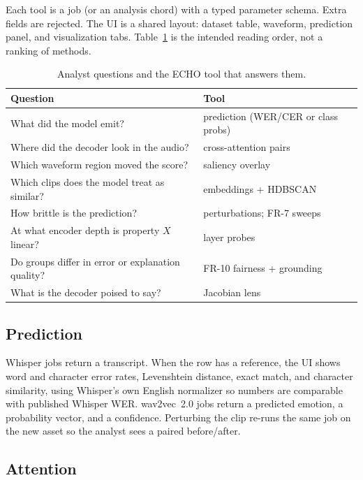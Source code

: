 \documentclass[conference]{IEEEtran}
\begin{document}
Each tool is a job (or an analysis chord) with a typed parameter schema. Extra fields are rejected. The UI is a shared layout: dataset table, waveform, prediction panel, and visualization tabs. Table~\ref{tab:questions} is the intended reading order, not a ranking of methods.

\begin{table}[!t]
\caption{Analyst questions and the ECHO tool that answers them.}
\label{tab:questions}
\centering
\setlength{\tabcolsep}{2.5pt}
\begin{tabular}{@{}p{}p{}@{}}
\toprule
Question & Tool \\
\midrule
What did the model emit? & prediction (WER/CER or class probs) \\
Where did the decoder look in the audio? & cross-attention pairs \\
Which waveform region moved the score? & saliency overlay \\
Which clips does the model treat as similar? & embeddings + HDBSCAN \\
How brittle is the prediction? & perturbations; FR-7 sweeps \\
At what encoder depth is property $X$ linear? & layer probes \\
Do groups differ in error or explanation quality? & FR-10 fairness + grounding \\
What is the decoder poised to say? & Jacobian lens \\
\bottomrule
\end{tabular}
\end{table}

\subsection{Prediction}

Whisper jobs return a transcript. When the row has a reference, the UI shows word and character error rates, Levenshtein distance, exact match, and character similarity, using Whisper's own English normalizer so numbers are comparable with published Whisper WER. wav2vec~2.0 jobs return a predicted emotion, a probability vector, and a confidence. Perturbing the clip re-runs the same job on the new asset so the analyst sees a paired before/after.

\subsection{Attention}
\end{document}
